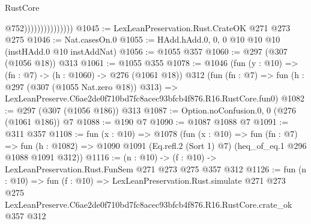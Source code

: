 \begin{lexlean}{RustCore}
\begin{coremodule}
                                  @752)))))))))))))))
@1045 := LexLeanPreservation.Rust.CrateOK @271 @273 @275
@1046 := Nat.casesOn.{0}
@1055 := HAdd.hAdd.{0, 0, 0} @10 @10 @10 (instHAdd.{0} @10 instAddNat)
@1056 := @1055 @357
@1060 := @297 (@307 (@1056 @18)) @313
@1061 := @1055 @355
@1078 := @1046
    (fun (y : @10) => (fn : @7) -> (h : @1060) -> @276 (@1061 @18))
    @312
    (fun (fn : @7) =>
    fun (h : @297 (@307 (@1055 Nat.zero @18)) @313) =>
    LexLeanPreserve.C6ae2de0f710bd7fc8acec93bfcb4f876.R16.RustCore.fun0)
@1082 := @297 (@307 (@1056 @186)) @313
@1087 := Option.noConfusion.{0, 0} (@276 (@1061 @186)) @7
@1088 := @190 @7
@1090 := @1087 @1088 @7
@1091 := @311 @357
@1108 := fun (x : @10) =>
  @1078
    (fun (x : @10) =>
    fun (fn : @7) =>
    fun (h : @1082) => @1090 @1091 (Eq.refl.{2} (Sort 1) @7) (heq_of_eq.{1} @296 @1088 @1091 @312))
@1116 := (n : @10) -> (f : @10) -> LexLeanPreservation.Rust.FunSem @271 @273 @275 @357 @312
@1126 := fun (n : @10) =>
  fun (f : @10) =>
  LexLeanPreservation.Rust.simulate
    @271
    @273
    @275
    LexLeanPreserve.C6ae2de0f710bd7fc8acec93bfcb4f876.R16.RustCore.crate_ok
    @357
    @312
\end{coremodule}
\end{lexlean}
